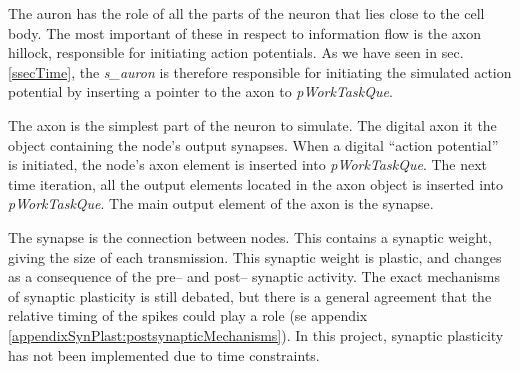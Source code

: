 


		The auron has the role of all the parts of the neuron that lies close to the cell body. 
		The most important of these in respect to information flow is the axon hillock, responsible for initiating action potentials.
		As we have seen in sec. \ref{ssecTime}, the \emph{s\_auron} is therefore responsible for initiating the simulated action potential       by inserting a pointer to the axon to \emph{pWorkTaskQue}. %

		The axon is the simplest part of the neuron to simulate.
		The digital axon it the object containing the node's output synapses.
		When a digital ``action potential'' is initiated, the node's axon element is inserted into \emph{pWorkTaskQue}.
		The next time iteration, all the output elements located in the axon object is inserted into \emph{pWorkTaskQue}.
		The main output element of the axon is the synapse.

		The synapse is the connection between nodes. This contains a synaptic weight, giving the size of each transmission.
		This synaptic weight is plastic, and changes as a consequence of the pre-- and post-- synaptic activity.
		The exact mechanisms of synaptic plasticity is still debated, but there is a general agreement that the relative timing of the spikes could play a role (se appendix \ref{appendixSynPlast:postsynapticMechanisms}).
		In this project, synaptic plasticity has not been implemented due to time constraints.




